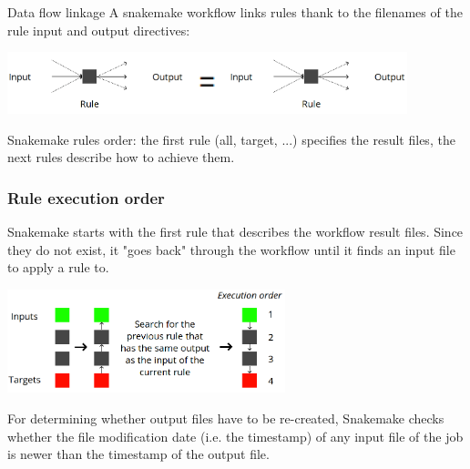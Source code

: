 \begin{frame}{Data flow linkage}
A snakemake workflow links rules thank to the filenames of the rule input and output directives:
\begin{center}
    \includegraphics[height=1.8cm]{03_workflow/images/FAIR_WF_rule_concept_en.png}\includegraphics[height=1.8cm]{03_workflow/images/FAIR_signeEgal.png}\includegraphics[height=1.8cm]{03_workflow/images/FAIR_WF_rule_concept_en.png}
\end{center}
\begin{block}{Snakemake rules order:}
   the first rule (all, target, ...) specifies the result files, the next rules describe how to achieve them.
\end{block}
\end{frame}
\begin{frame}[containsverbatim]
\frametitle{Rule execution order}
Snakemake starts with the first rule that describes the workflow result files. Since they do not exist, it "goes back" through the workflow until it finds an input file to apply a rule to. 
\begin{center}
    \includegraphics[height=3cm]{03_workflow/images/FAIR_smke_rule_order_en.png}
\end{center}
For determining whether output files have to be re-created, Snakemake checks whether the file modification date (i.e. the timestamp) of any input file of the job is newer than the timestamp of the output file.
\end{frame}
